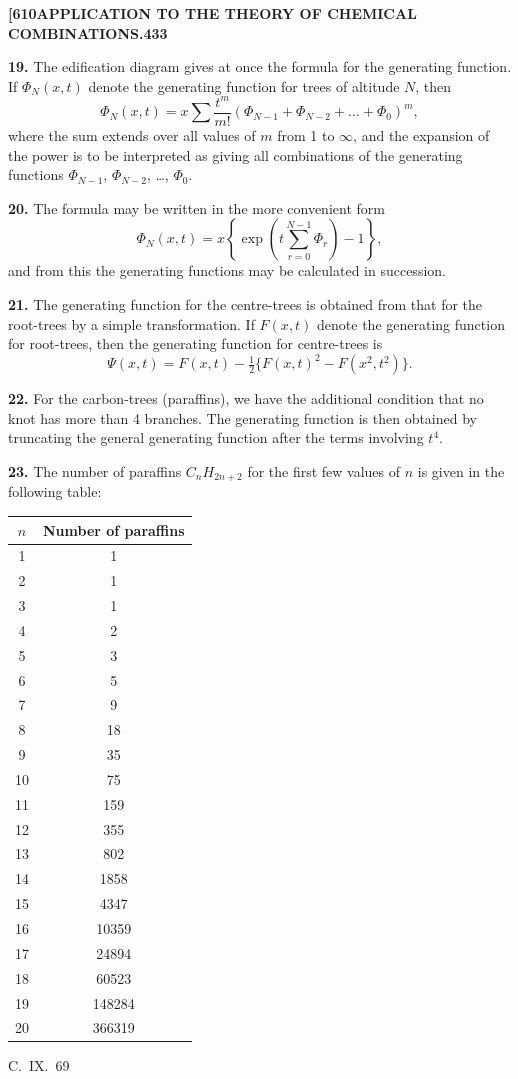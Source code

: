 \documentclass[11pt,a4paper]{article}
\begin{document}
{\newpage
\noindent\textbf{[610}\hspace{\fill}\textbf{APPLICATION TO THE THEORY OF CHEMICAL COMBINATIONS.}\hspace{\fill}\textbf{433}

\noindent\textbf{19.}
The edification diagram gives at once the formula for the generating function. If $\Phi_N(x,t)$ denote the generating function for trees of altitude $N$, then
\[
\Phi_N(x,t) = x \sum \frac{t^m}{m!} \left(\Phi_{N-1} + \Phi_{N-2} + \ldots + \Phi_0\right)^m,
\]
where the sum extends over all values of $m$ from 1 to $\infty$, and the expansion of the power is to be interpreted as giving all combinations of the generating functions $\Phi_{N-1}$, $\Phi_{N-2}$, \ldots, $\Phi_0$.

\medskip
\noindent\textbf{20.}
The formula may be written in the more convenient form
\[
\Phi_N(x,t) = x \left\{\exp\left(t \sum_{r=0}^{N-1} \Phi_r\right) - 1\right\},
\]
and from this the generating functions may be calculated in succession.

\medskip
\noindent\textbf{21.}
The generating function for the centre-trees is obtained from that for the root-trees by a simple transformation. If $F(x,t)$ denote the generating function for root-trees, then the generating function for centre-trees is
\[
\Psi(x,t) = F(x,t) - \tfrac{1}{2}\{F(x,t)^2 - F(x^2,t^2)\}.
\]

\medskip
\noindent\textbf{22.}
For the carbon-trees (paraffins), we have the additional condition that no knot has more than 4 branches. The generating function is then obtained by truncating the general generating function after the terms involving $t^4$.

\medskip
\noindent\textbf{23.}
The number of paraffins $C_nH_{2n+2}$ for the first few values of $n$ is given in the following table:

\begin{center}
\begin{tabular}{|c|c|}
\hline
$n$ & Number of paraffins \\
\hline
1 & 1 \\
2 & 1 \\
3 & 1 \\
4 & 2 \\
5 & 3 \\
6 & 5 \\
7 & 9 \\
8 & 18 \\
9 & 35 \\
10 & 75 \\
11 & 159 \\
12 & 355 \\
13 & 802 \\
14 & 1858 \\
15 & 4347 \\
16 & 10359 \\
17 & 24894 \\
18 & 60523 \\
19 & 148284 \\
20 & 366319 \\
\hline
\end{tabular}
\end{center}
\hfill C.~IX.\ 69

}
\end{document}
